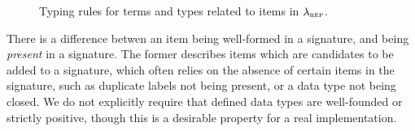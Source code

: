 \begin{figure}[H]
  \caption{Typing rules for terms and types related to items in $\lambda_{\textsc{rep}}$.}
  \label{fig:lambdaind-rules}
\end{figure}

There is a difference betwen an item being well-formed in a signature, and
being \emph{present} in a signature. The former describes items which are
candidates to be added to a signature, which often relies on the absence of
certain items in the signature, such as duplicate labels not being present, or
a data type not being closed. We do not explicitly require that defined data
types are well-founded or strictly positive, though this is a desirable
property for a real implementation. 

